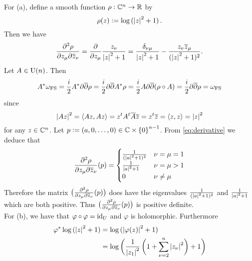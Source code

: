 \begin{solution}
For (a), define a smooth function $\rho: \mathbb{C}^n \to \mathbb{R}$ by 
\begin{equation*}
\rho(z) := \log\del[0]{\abs[0]{z}^2 + 1}.
\end{equation*}
Then we have 
\begin{equation}
\frac{\partial^2 \rho}{\partial z_\mu \partial\overline{z}_\nu} = \frac{\partial}{\partial z_\mu} \frac{z_\nu}{\abs[0]{z}^2 + 1} = \frac{\delta_{\nu\mu}}{\abs[0]{z}^2 + 1} - \frac{z_\nu \overline{z}_\mu}{(\abs[0]{z}^2 + 1)^2}.
\label{eq:derivative}
\end{equation}
Let $A \in \mathrm{U}(n)$. Then 
\begin{equation*}
A^*\omega_{\mathrm{FS}} = \frac{i}{2}A^*\partial\overline{\partial}\rho = \frac{i}{2}\partial\overline{\partial}A^*\rho = \frac{i}{2}A\partial\overline{\partial}(\rho \circ A) = \frac{i}{2}\partial\overline{\partial}\rho = \omega_{\mathrm{FS}}
\end{equation*}
\noindent since
\begin{equation*}
\abs[0]{Az}^2 = \langle Az,Az \rangle = z^tA^t\overline{A}\overline{z} = z^t\overline{z} = \langle z,z \rangle = \abs[0]{z}^2
\end{equation*}
\noindent for any $z \in \mathbb{C}^n$. Let $p := (a,0,\dots,0) \in \Cbb \times \cbr[0]{0}^{n-1}$. From \ref{eq:derivative} we deduce that
\begin{align*}
\frac{\partial^2 \rho}{\partial z_\mu \partial\overline{z}_\nu}(p) = \begin{cases}
\frac{1}{(\abs[0]{a}^2 + 1)^2} & \nu = \mu = 1\\
\frac{1}{\abs[0]{a}^2 + 1} & \nu = \mu > 1\\
0 & \nu \neq \mu
\end{cases}
\end{align*}
Therefore the matrix $\del[1]{\frac{\partial^2 \rho}{\partial z_\mu \partial\overline{z}_\nu}(p)}$ does have the eigenvalues $\frac{1}{(\abs[0]{a}^2 + 1)^2}$ and $\frac{1}{\abs[0]{a}^2 + 1}$ which are both positive. Thus $\del[1]{\frac{\partial^2 \rho}{\partial z_\mu \partial\overline{z}_\nu}(p)}$ is positive definite.\\
For (b), we have that $\varphi \circ \varphi = \operatorname{id}_U$ and $\varphi$ is holomorphic. Furthermore
\begin{align*}
\varphi^*\log\del[0]{\abs[0]{z}^2 + 1} &= \log\del[0]{\abs[0]{\varphi(z)}^2 + 1}\\
&= \log\del[3]{\frac{1}{\abs[0]{z_1}^2}\del[3]{1 + \sum_{\nu = 2}^n\abs[0]{z_\nu}^2} + 1}\\

\end{align*}
\end{solution}
